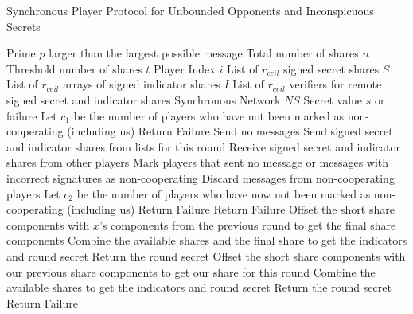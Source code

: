 \documentclass{dalcsthesis}
\begin{document}
\begin{algorithm}
  \caption{Synchronous Player Protocol for Unbounded Opponents and Inconspicuous Secrets}
  \label{alg:SUI_Player}
  \begin{algorithmic}[1]
    \INPUT Prime $p$ larger than the largest possible message
    \INPUT Total number of shares $n$
    \INPUT Threshold number of shares $t$
    \INPUT Player Index $i$
    \INPUT List of $r_{ceil}$ signed secret shares $S$
    \INPUT List of $r_{ceil}$ arrays of signed indicator shares $I$
    \INPUT List of $r_{ceil}$ verifiers for remote signed secret and indicator shares
    \INPUT Synchronous Network $NS$
    \OUTPUT Secret value $s$ or failure
      \STATE Let $c_1$ be the number of players who have not been marked as non-cooperating (including us)
      	\STATE Return Failure
      \ENDIF
      	\STATE Send no messages
      \ELSE
      	\STATE Send signed secret and indicator shares from lists for this round
      \ENDIF
      \STATE Receive signed secret and indicator shares from other players
      \STATE Mark players that sent no message or messages with incorrect signatures as non-cooperating
      \STATE Discard messages from non-cooperating players
      \STATE Let $c_2$ be the number of players who have now not been marked as non-cooperating (including us)
      	\STATE Return Failure
          \STATE Return Failure
            \STATE Offset the short share components with $x$'s components from the previous round to get the final share components
            \STATE Combine the available shares and the final share to get the indicators and round secret
              \STATE Return the round secret 
            \ENDIF
          \ENDFOR
        \ENDIF
      \ELSE
          \STATE Offset the short share components with our previous share components to get our share for this round
        \ENDIF
        \STATE Combine the available shares to get the indicators and round secret
          \STATE Return the round secret 
        \ENDIF
      \ENDIF
    \ENDFOR
    \STATE Return Failure
  \end{algorithmic}
\end{algorithm}
\end{document}
